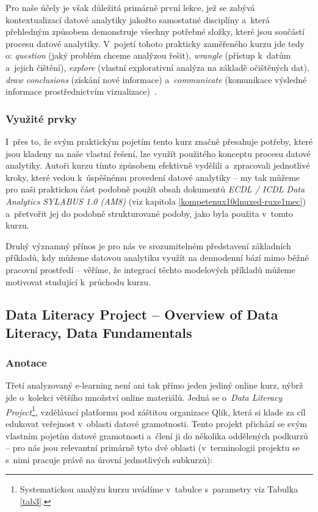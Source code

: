 Pro naše účely je však důležitá primárně první lekce, jež se zabývá kontextualizací datové analytiky jakožto samostatné disciplíny a~která přehledným způsobem demonstruje všechny potřebné složky, které jsou součástí procesu datové analytiky. V~pojetí tohoto prakticky zaměřeného kurzu jde tedy o: \emph{question} (jaký problém chceme analýzou řešit), \emph{wrangle} (přístup k~datům a~jejich čištění), \emph{explore} (vlastní explorativní analýza na základě očištěných dat), \emph{draw conclusions} (získání nové informace) a~\emph{communicate} (komunikace výsledné informace prostřednictvím vizualizace)~\parencite{course2}.

\hypertarget{vyuux17eituxe9-prvky-1}{%
\subsubsection{Využité prvky}\label{vyuux17eituxe9-prvky-1}}

I~přes to, že svým praktickým pojetím tento kurz značně přesahuje potřeby, které jsou kladeny na naše vlastní řešení, lze využít použitého konceptu procesu datové analytiky. Autoři kurzu tímto způsobem efektivně vydělili a~zpracovali jednotlivé kroky, které vedou k~úspěšnému provedení datové analytiky -- my tak můžeme pro naši praktickou část podobně použít obsah dokumentů \emph{ECDL / ICDL Data Analytics SYLABUS 1.0 (AM8)} (viz kapitola \ref{kompetenux10dnuxed-ruxe1mec}) a~přetvořit jej do podobně strukturované podoby, jako byla použita v~tomto kurzu.

Druhý významný přínos je pro nás ve srozumitelném představení základních příkladů, kdy můžeme datovou analytiku využít na dennodenní bází mimo běžné pracovní prostředí -- věříme, že integrací těchto modelových příkladů můžeme motivovat studující k~průchodu kurzu.

\hypertarget{data-literacy-project-overview-of-data-literacy-data-fundamentals}{%
\subsection{Data Literacy Project -- Overview of Data Literacy, Data Fundamentals}\label{data-literacy-project-overview-of-data-literacy-data-fundamentals}}

\hypertarget{anotace-2}{%
\subsubsection{Anotace}\label{anotace-2}}

Třetí analyzovaný e-learning není ani tak přímo jeden jediný online kurz, nýbrž jde o~kolekci většího množství online materiálů. Jedná se o~\emph{Data Literacy Project}\footnote{Systematickou analýzu kurzu uvádíme v~tabulce s~parametry viz Tabulka \ref{tab3}.}, vzdělávací platformu pod záštitou organizace Qlik, která si klade za cíl edukovat veřejnost v~oblasti datové gramotnosti. Tento projekt přichází se svým vlastním pojetím datové gramotnosti a~člení ji do několika oddělených podkurzů -- pro nás jsou relevantní primárně tyto dvě oblasti (v~terminologii projektu se s~nimi pracuje právě na úrovní jednotlivých subkurzů):

